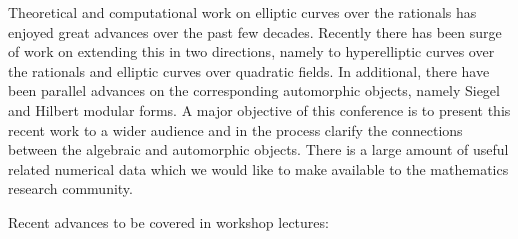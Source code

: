 \documentclass[amstex,11pt]{amsart}
\numberwithin{equation}{section}
\begin{document}
\bigskip

Theoretical and computational work on elliptic curves over the
rationals has enjoyed great advances over the past few decades.
Recently there has been surge of work on extending this in two
directions, namely to hyperelliptic curves over the rationals and
elliptic curves over quadratic fields.  In additional, there have been
parallel advances on the corresponding automorphic objects, namely
Siegel and Hilbert modular forms.  A major objective of this
conference is to present this recent work to a wider audience and in
the process clarify the connections between the algebraic and
automorphic objects.  There is a large amount of useful related
numerical data which we would like to make available to the
mathematics research community.

Recent advances to be covered in workshop lectures:
\end{document}
